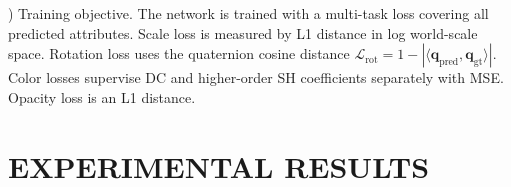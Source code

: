 \documentclass[letterpaper,journal]{IEEEtran}
\begin{document}
\vspace{0.35em}
) Training objective. The network is trained with a multi-task loss covering all predicted attributes. Scale loss is measured by L1 distance in log world-scale space. Rotation loss uses the quaternion cosine distance $\mathcal{L}_{\text{rot}} = 1 - |\langle \mathbf{q}_{\text{pred}}, \mathbf{q}_{\text{gt}} \rangle|$. Color losses supervise DC and higher-order SH coefficients separately with MSE. Opacity loss is an L1 distance.


\section{EXPERIMENTAL RESULTS}
\end{document}
